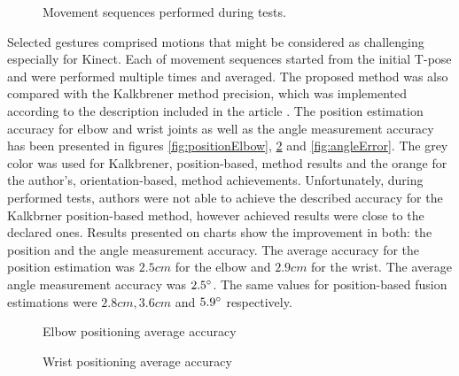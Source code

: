\documentclass[9pt]{llncs}
\begin{document}
\begin{figure}[!htb]
	\vspace{2.5cm}
	\caption{Movement sequences performed during tests.}
	\label{fig:poses}
\end{figure}


Selected gestures comprised motions that might be considered as challenging especially for Kinect. Each of movement sequences started from the initial T-pose and were performed multiple times and averaged. 
The proposed method was also compared with the Kalkbrener method precision, which was implemented according to the description included in the article \cite{Kalkbrenner2014}. 
The position estimation accuracy for elbow and wrist joints as well as the angle measurement accuracy has been presented in figures \ref{fig:positionElbow}, \ref{fig:positionWrist} and \ref{fig:angleError}. The grey color was used for Kalkbrener, position-based, method results and the orange for the author's, orientation-based, method achievements. Unfortunately, during performed tests, authors were not able to achieve the described accuracy for the Kalkbrner position-based method, however achieved results were close to the declared ones. Results presented on charts show the improvement in both: the position and the angle measurement accuracy. The average accuracy for the position estimation was $2.5 cm$ for the elbow and $2.9 cm$ for the wrist. The average angle measurement accuracy was $2.5\degree$. The same values for position-based fusion estimations were $2.8 cm, 3.6 cm$ and $5.9\degree$ respectively.

\begin{figure}[!htb]
	\centering
	\begin{minipage}[b]{0.49\linewidth}
		\centering   
		\vspace{2.5cm}
		\caption{Elbow positioning average accuracy}
		\label{fig:positionElbow}
	\end{minipage}
	\begin{minipage}[b]{0.49\linewidth}
		\centering 
		\vspace{2.5cm}
		\caption{Wrist positioning average accuracy}
		\label{fig:positionWrist}
	\end{minipage}
	
\end{figure}
\end{document}
